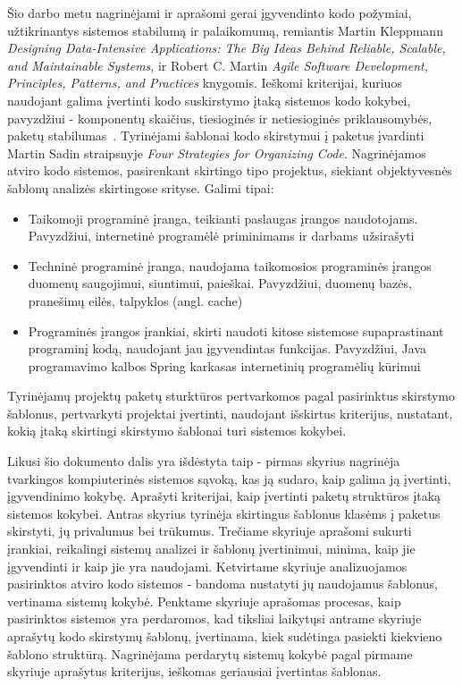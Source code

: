 Šio darbo metu nagrinėjami ir aprašomi gerai įgyvendinto kodo požymiai, užtikrinantys
sistemos stabilumą ir palaikomumą, remiantis Martin Kleppmann \textit{Designing Data-Intensive Applications: The Big Ideas Behind Reliable, Scalable, and Maintainable Systems},
ir Robert C. Martin \textit{Agile Software Development, Principles, Patterns, and Practices} knygomis.
Ieškomi kriterijai, kuriuos naudojant galima įvertinti kodo suskirstymo įtaką sistemos kodo kokybei, pavyzdžiui - komponentų skaičius,
tiesioginės ir netiesioginės priklausomybės, paketų stabilumas~\cite{AgileSoftwareDevelopment}.
Tyrinėjami šablonai kodo skirstymui į paketus įvardinti Martin Sadin straipsnyje \textit{Four Strategies for Organizing Code}.
Nagrinėjamos atviro kodo sistemos, pasirenkant skirtingo tipo projektus, siekiant
objektyvesnės šablonų analizės skirtingose srityse.
Galimi tipai:
    \begin{itemize}
        \item Taikomoji programinė įranga, teikianti paslaugas įrangos naudotojams. Pavyzdžiui,
internetinė programėlė priminimams ir darbams užsirašyti
        \item Techninė programinė įranga, naudojama taikomosios programinės įrangos duomenų
saugojimui, siuntimui, paieškai. Pavyzdžiui, duomenų bazės, pranešimų eilės, talpyklos
(angl. cache)
        \item Programinės įrangos įrankiai, skirti naudoti kitose sistemose supaprastinant programinį
kodą, naudojant jau įgyvendintas funkcijas. Pavyzdžiui, Java programavimo kalbos
Spring karkasas internetinių programėlių kūrimui
    \end{itemize}
Tyrinėjamų projektų paketų sturktūros pertvarkomos pagal pasirinktus skirstymo šablonus, pertvarkyti projektai įvertinti, naudojant išskirtus kriterijus, nustatant, kokią įtaką
skirtingi skirstymo šablonai turi sistemos kokybei.

Likusi šio dokumento dalis yra išdėstyta taip - pirmas skyrius nagrinėja tvarkingos kompiuterinės sistemos sąvoką, kas ją sudaro, kaip galima ją įvertinti, įgyvendinimo kokybę.
Aprašyti kriterijai, kaip įvertinti paketų struktūros įtaką sistemos kokybei.
Antras skyrius tyrinėja skirtingus šablonus klasėms į paketus skirstyti, jų privalumus bei trūkumus.
Trečiame skyriuje aprašomi sukurti įrankiai, reikalingi sistemų analizei ir šablonų įvertinimui, minima, kaip jie įgyvendinti ir kaip jie yra naudojami.
Ketvirtame skyriuje analizuojamos pasirinktos atviro kodo sistemos - bandoma nustatyti jų naudojamus šablonus, vertinama sistemų kokybė.
Penktame skyriuje aprašomas procesas, kaip pasirinktos sistemos yra perdaromos, kad tiksliai laikytųsi antrame skyriuje aprašytų kodo skirstymų šablonų, įvertinama, kiek sudėtinga pasiekti kiekvieno šablono struktūrą.
Nagrinėjama perdarytų sistemų kokybė pagal pirmame skyriuje aprašytus kriterijus, ieškomas geriausiai įvertintas šablonas.

